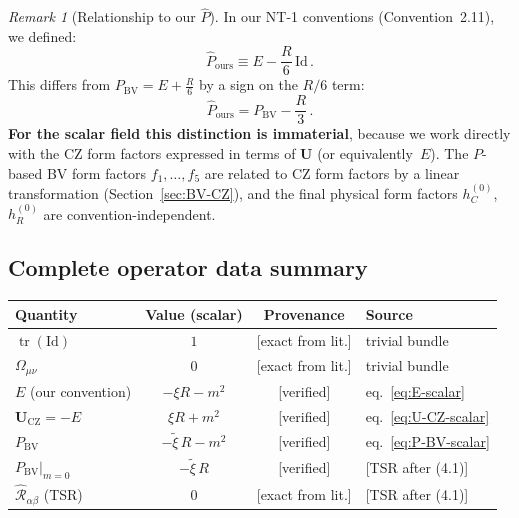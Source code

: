 \documentclass[12pt,a4paper]{article}
\theoremstyle{definition}
\theoremstyle{remark}
\newtheorem{remark}[proposition]{Remark}
\newcommand{\tr}{\operatorname{tr}}
\newcommand{\Id}{\mathrm{Id}}
\newcommand{\fromlit}[1]{\textcolor{blue!70!black}{\textsf{[#1]}}}
\newcommand{\exactlit}{\textcolor{blue!60!black}{\textsf{[exact from lit.]}}}
\newcommand{\verified}{\textcolor{green!50!black}{\textsf{[verified]}}}
\begin{document}
\begin{remark}[Relationship to our $\hat{P}$]
\label{rem:Phat}
In our NT-1 conventions (Convention~2.11), we defined:
\begin{equation}
  \hat{P}_{\mathrm{ours}} \equiv E - \frac{R}{6}\,\Id\,.
  \label{eq:Phat-ours}
\end{equation}
This differs from $P_{\mathrm{BV}} = E + \frac{R}{6}$ by a sign
on the $R/6$ term:
\begin{equation}
  \hat{P}_{\mathrm{ours}} = P_{\mathrm{BV}} - \frac{R}{3}\,.
  \label{eq:Phat-vs-PBV}
\end{equation}
\textbf{For the scalar field this distinction is immaterial}, because
we work directly with the CZ form factors expressed in terms of
$\mathbf{U}$ (or equivalently~$E$).  The $P$-based BV form factors
$f_1,\ldots,f_5$ are related to CZ form factors by a linear
transformation (Section~\ref{sec:BV-CZ}), and the final physical
form factors $h_C^{(0)}$, $h_R^{(0)}$ are
convention-independent.
\end{remark}


\subsection{Complete operator data summary}

\begin{center}
\renewcommand{\arraystretch}{1.4}
\begin{tabular}{lccl}
\toprule
\textbf{Quantity} & \textbf{Value (scalar)} & \textbf{Provenance} & \textbf{Source} \\
\midrule
$\tr(\Id)$ & $1$ & \exactlit & trivial bundle \\
$\Omega_{\mu\nu}$ & $0$ & \exactlit & trivial bundle \\
$E$ (our convention) & $-\xi R - m^2$ & \verified & eq.~\eqref{eq:E-scalar} \\
$\mathbf{U}_{\mathrm{CZ}} = -E$ & $\xi R + m^2$ & \verified & eq.~\eqref{eq:U-CZ-scalar} \\
$P_{\mathrm{BV}}$ & $-\tilde{\xi}\,R - m^2$ & \verified & eq.~\eqref{eq:P-BV-scalar} \\
$P_{\mathrm{BV}}|_{m=0}$ & $-\tilde{\xi}\,R$ & \verified &
  \fromlit{TSR after (4.1)} \\
$\hat{\mathcal{R}}_{\alpha\beta}$ (TSR) & $0$ & \exactlit &
  \fromlit{TSR after (4.1)} \\
\bottomrule
\end{tabular}
\end{center}
\end{document}
